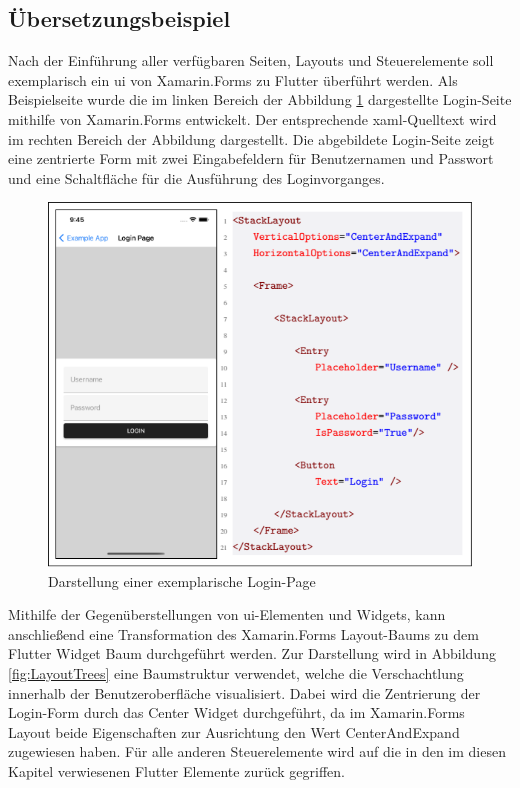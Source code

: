 \subsection{Übersetzungsbeispiel}
Nach der Einführung aller verfügbaren Seiten,  Layouts und Steuerelemente soll exemplarisch ein \ac{ui} von Xamarin.Forms zu Flutter überführt werden.  Als Beispielseite wurde die im linken Bereich der Abbildung \ref{fig:ExamplePage} dargestellte Login-Seite mithilfe von Xamarin.Forms entwickelt.  Der entsprechende \ac{xaml}-Quelltext wird im rechten Bereich der Abbildung dargestellt.  Die abgebildete Login-Seite zeigt eine zentrierte Form mit zwei Eingabefeldern für Benutzernamen und Passwort und eine Schaltfläche für die Ausführung des Loginvorganges.  

\begin{figure}[!ht]
 \includegraphics[width=\textwidth,height=\textheight,keepaspectratio]{Images/CrossPlattformFrameworks/ExamplePage.png}
 \caption{Darstellung einer exemplarische Login-Page}
 \label{fig:ExamplePage}
\end{figure}


Mithilfe der Gegenüberstellungen von \ac{ui}-Elementen und Widgets,  kann anschließend eine Transformation des Xamarin.Forms Layout-Baums zu dem Flutter Widget Baum durchgeführt werden.  Zur Darstellung wird in Abbildung \ref{fig:LayoutTrees} eine Baumstruktur verwendet,  welche die Verschachtlung innerhalb der Benutzeroberfläche visualisiert.  Dabei wird die Zentrierung der Login-Form durch das Center Widget durchgeführt,  da im Xamarin.Forms Layout beide Eigenschaften zur Ausrichtung den Wert CenterAndExpand zugewiesen haben.  Für alle anderen Steuerelemente wird auf die in den im diesen Kapitel verwiesenen Flutter Elemente zurück gegriffen. 

